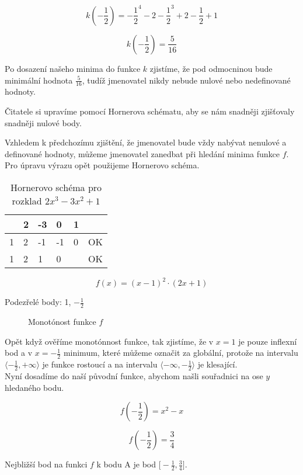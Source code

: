 \begin{displaymath}
k(-\frac{1}{2})=-\frac{1}{2}^4 -2-\frac{1}{2}^3 + 2-\frac{1}{2} + 1
\end{displaymath}

\begin{displaymath}
k(-\frac{1}{2})=\frac{5}{16}
\end{displaymath}

Po dosazení našeho minima do funkce \(k\) zjistíme, že pod odmocninou bude minimální hodnota \(\frac{5}{16}\), tudíž jmenovatel nikdy nebude nulové nebo nedefinované hodnoty.

Čitatele si upravíme pomocí Hornerova schématu, aby se nám snadněji zjišťovaly snadněji nulové body.

Vzhledem k předchozímu zjištění, že jmenovatel bude vždy nabývat nenulové a definované hodnoty, můžeme jmenovatel zanedbat při hledání minima funkce \(f\).\\

Pro úpravu výrazu opět použijeme Hornerovo schéma.

\begin{table}[!h]
\centering
\begin{tabular}{l||l|l|l|l|l}
	 & 2 & -3 &  0 & 1 &    \\ \hline\hline
   1 & 2 & -1 & -1 & 0 & OK \\ \hline
   1 & 2 &  1 &  0 &   & OK \\
\end{tabular}
\caption{Hornerovo schéma pro rozklad $2x^3 - 3x^2 + 1$}
\end{table}

\begin{displaymath}
f(x)=(x-1)^2\cdot (2x +1)
\end{displaymath}

Podezřelé body: 1, \(-\frac{1}{2}\)

\begin{figure}[H]
	\centering
	
	\caption{Monotónost funkce \(f\)}
\end{figure}

Opět když ověříme monotónnost funkce, tak zjistíme, že v $x=1$ je pouze inflexní bod a v $x=-\frac{1}{2}$ minimum, 
které můžeme označit za globální, protože na intervalu \(\langle-\frac{1}{2},+\infty\rangle\) je funkce rostoucí 
a na intervalu \(\langle-\infty,-\frac{1}{2}\rangle\) je klesající.\\
Nyní dosadíme do naší původní funkce, abychom našli souřadnici na ose \(y\) hledaného bodu.

\begin{displaymath}
f(-\frac{1}{2})= x^2 - x
\end{displaymath}

\begin{displaymath}
f(-\frac{1}{2})= \frac{3}{4}
\end{displaymath}

{\Large Nejbližší bod na funkci $f$ k bodu A je bod $\big[-\frac{1}{2}, \frac{3}{4}\big]$.}
